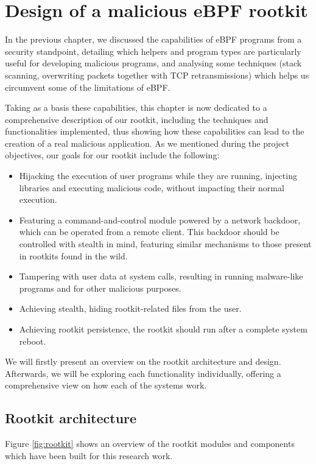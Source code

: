 \chapter{Design of a malicious eBPF rootkit} \label{chapter:rootkit_design}
In the previous chapter, we discussed the capabilities of eBPF programs from a security standpoint, detailing which helpers and program types are particularly useful for developing malicious programs, and analysing some techniques (stack scanning, overwriting packets together with TCP retransmissions) which helps us circumvent some of the limitations of eBPF.

Taking as a basis these capabilities, this chapter is now dedicated to a comprehensive description of our rootkit, including the techniques and functionalities implemented, thus showing how these capabilities can lead to the creation of a real malicious application. As we mentioned during the project objectives, our goals for our rootkit include the following:
\begin{itemize}
\item Hijacking the execution of user programs while they are running, injecting libraries and executing malicious code, without impacting their normal execution.
\item Featuring a command-and-control module powered by a network backdoor, which can be operated from a remote client. This backdoor should be controlled with stealth in mind, featuring similar mechanisms to those present in rootkits found in the wild.
\item Tampering with user data at system calls, resulting in running malware-like programs and for other malicious purposes.
\item Achieving stealth, hiding rootkit-related files from the user.
\item Achieving rootkit persistence, the rootkit should run after a complete system reboot.
\end{itemize}

We will firstly present an overview on the rootkit architecture and design. Afterwards, we will be exploring each functionality individually, offering a comprehensive view on how each of the systems work.


\section{Rootkit architecture} \label{section:rootkit_arch}
Figure \ref{fig:rootkit} shows an overview of the rootkit modules and components which have been built for this research work.

